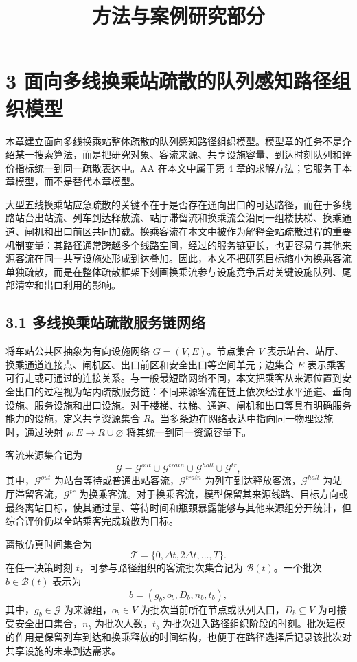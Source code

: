 \documentclass[UTF8,a4paper,12pt]{ctexart}
\title{方法与案例研究部分}
\author{}
\date{}
\begin{document}
\maketitle

\section{3 面向多线换乘站疏散的队列感知路径组织模型}

本章建立面向多线换乘站整体疏散的队列感知路径组织模型。模型章的任务不是介绍某一搜索算法，而是把研究对象、客流来源、共享设施容量、到达时刻队列和评价指标统一到同一疏散表达中。AA 在本文中属于第 4 章的求解方法；它服务于本章模型，而不是替代本章模型。

大型五线换乘站应急疏散的关键不在于是否存在通向出口的可达路径，而在于多线路站台出站流、列车到达释放流、站厅滞留流和换乘流会沿同一组楼扶梯、换乘通道、闸机和出口前区共同加载。换乘客流在本文中被作为解释全站疏散过程的重要机制变量：其路径通常跨越多个线路空间，经过的服务链更长，也更容易与其他来源客流在同一共享设施处形成到达叠加。因此，本文不把研究目标缩小为换乘客流单独疏散，而是在整体疏散框架下刻画换乘流参与设施竞争后对关键设施队列、尾部清空和出口利用的影响。

\subsection{3.1 多线换乘站疏散服务链网络}

将车站公共区抽象为有向设施网络 \(G=(V,E)\)。节点集合 \(V\) 表示站台、站厅、换乘通道连接点、闸机区、出口前区和安全出口等空间单元；边集合 \(E\) 表示乘客可行走或可通过的连接关系。与一般最短路网络不同，本文把乘客从来源位置到安全出口的过程视为站内疏散服务链：不同来源客流在链上依次经过水平通道、垂向设施、服务设施和出口设施。对于楼梯、扶梯、通道、闸机和出口等具有明确服务能力的设施，定义共享资源集合 \(R\)。当多条边在网络表达中指向同一物理设施时，通过映射 \(\rho:E\rightarrow R\cup\varnothing\) 将其统一到同一资源容量下。

客流来源集合记为
\[
\mathcal G=\mathcal G^{out}\cup \mathcal G^{train}\cup \mathcal G^{hall}\cup \mathcal G^{tr},
\]
其中，\(\mathcal G^{out}\) 为站台等待或普通出站客流，\(\mathcal G^{train}\) 为列车到达释放客流，\(\mathcal G^{hall}\) 为站厅滞留客流，\(\mathcal G^{tr}\) 为换乘客流。对于换乘客流，模型保留其来源线路、目标方向或最终离站目标，使其通过量、等待时间和瓶颈暴露能够与其他来源组分开统计，但综合评价仍以全站乘客完成疏散为目标。

离散仿真时间集合为
\[
\mathcal T=\{0,\Delta t,2\Delta t,\ldots,T\}.
\]
在任一决策时刻 \(t\)，可参与路径组织的客流批次集合记为 \(\mathcal B(t)\)。一个批次 \(b\in\mathcal B(t)\) 表示为
\[
b=(g_b,o_b,D_b,n_b,t_b),
\]
其中，\(g_b\in\mathcal G\) 为来源组，\(o_b\in V\) 为批次当前所在节点或队列入口，\(D_b\subseteq V\) 为可接受安全出口集合，\(n_b\) 为批次人数，\(t_b\) 为批次进入路径组织阶段的时刻。批次建模的作用是保留列车到达和换乘释放的时间结构，也便于在路径选择后记录该批次对共享设施的未来到达需求。
\end{document}
